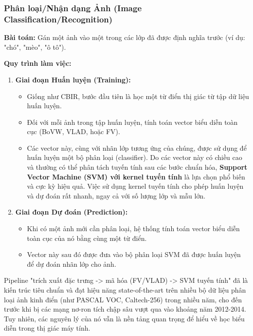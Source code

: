 \subsubsection{Phân loại/Nhận dạng Ảnh (Image Classification/Recognition)}
\label{subsubsec:image_classification}
\textbf{Bài toán:} Gán một ảnh vào một trong các lớp đã được định nghĩa trước (ví dụ: "chó", "mèo", "ô tô").

\textbf{Quy trình làm việc:}
\begin{enumerate}
    \item \textbf{Giai đoạn Huấn luyện (Training):}
    \begin{itemize}
        \item Giống như CBIR, bước đầu tiên là học một từ điển thị giác từ tập dữ liệu huấn luyện.
        \item Đối với mỗi ảnh trong tập huấn luyện, tính toán vector biểu diễn toàn cục (BoVW, VLAD, hoặc FV).
        \item Các vector này, cùng với nhãn lớp tương ứng của chúng, được sử dụng để huấn luyện một bộ phân loại (classifier). Do các vector này có chiều cao và thường có thể phân tách tuyến tính sau các bước chuẩn hóa, \textbf{Support Vector Machine (SVM) với kernel tuyến tính} là lựa chọn phổ biến và cực kỳ hiệu quả. Việc sử dụng kernel tuyến tính cho phép huấn luyện và dự đoán rất nhanh, ngay cả với số lượng lớp và mẫu lớn.
    \end{itemize}
    \item \textbf{Giai đoạn Dự đoán (Prediction):}
    \begin{itemize}
        \item Khi có một ảnh mới cần phân loại, hệ thống tính toán vector biểu diễn toàn cục của nó bằng cùng một từ điển.
        \item Vector này sau đó được đưa vào bộ phân loại SVM đã được huấn luyện để dự đoán nhãn lớp cho ảnh.
    \end{itemize}
\end{enumerate}
Pipeline "trích xuất đặc trưng -> mã hóa (FV/VLAD) -> SVM tuyến tính" đã là kiến trúc tiêu chuẩn và đạt hiệu năng state-of-the-art trên nhiều bộ dữ liệu phân loại ảnh kinh điển (như PASCAL VOC, Caltech-256) trong nhiều năm, cho đến trước khi bị các mạng nơ-ron tích chập sâu vượt qua vào khoảng năm 2012-2014. Tuy nhiên, các nguyên lý của nó vẫn là nền tảng quan trọng để hiểu về học biểu diễn trong thị giác máy tính.

